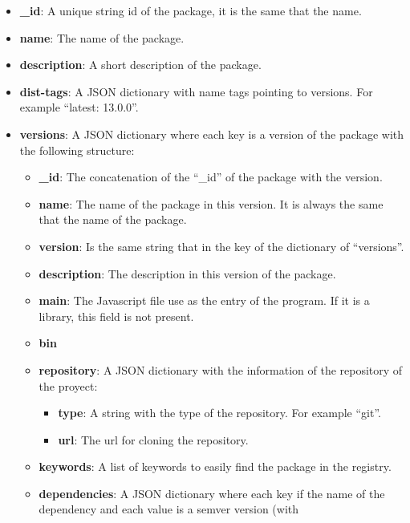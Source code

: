 \documentclass[letterpaper,12pt]{report}
\begin{document}
\begin{itemize}
    \item \textbf{\_id}: A unique string id of the package, it is the same that the
        name.
    \item \textbf{name}: The name of the package.
    \item \textbf{description}: A short description of the package.
    \item \textbf{dist-tags}: A JSON dictionary with name tags pointing to versions.
        For example ``latest: 13.0.0''.
    \item \textbf{versions}: A JSON dictionary where each key is a version of the
        package with the following structure:
        \begin{itemize}
            \item \textbf{\_id}: The concatenation of the ``\_id'' of the package
                with the version.
            \item \textbf{name}: The name of the package in this version. It is
                always the same that the name of the package.
            \item  \textbf{version}: Is the same string that in the key of the
                dictionary of ``versions''.
            \item \textbf{description}: The description in this version of the
                package.
            \item \textbf{main}: The Javascript file use as the entry of the program.
                If it is a library, this field is not present.
            \item \textbf{bin}
            \item \textbf{repository}: A JSON dictionary with the information of
                the repository of the proyect:
                \begin{itemize}
                    \item \textbf{type}: A string with the type of the
                        repository. For example ``git''.
                    \item \textbf{url}: The url for cloning the repository.
                \end{itemize}
            \item \textbf{keywords}: A list of keywords to easily find the
                package in the registry.
            \item \textbf{dependencies}: A JSON dictionary where each key if the
                name of the dependency and each value is a semver version (with

\end{itemize}
\end{itemize}
\end{document}
